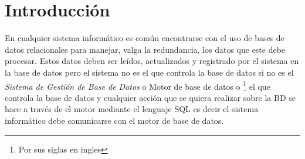 \chapter{Introducción}\label{capitulo:intro}
En cualquier sistema informático es común encontrarse con el uso de bases de datos relacionales para manejar, valga la redundancia, los datos que este debe procesar. Estos datos deben ser leídos, actualizados y registrado por el sistema en la base de datos pero el sistema no es el que controla la base de datos si no es el \textit{Sistema de Gestión de Base de Datos} o Motor de base de datos o \dd\footnote{Por sus siglas en ingles} el que controla la base de datos y cualquier acción que se quiera realizar sobre la BD se hace a través de el motor mediante el lenguaje SQL es decir el sistema informático debe comunicarse con el motor de base de datos. 

